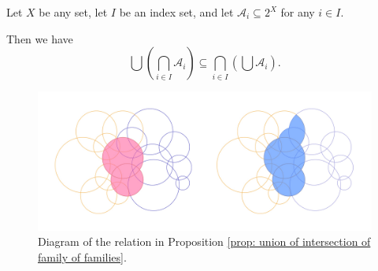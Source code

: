 \begin{proposition}
	\label{prop: union of intersection of family of families}
	Let $X$ be any set, let $I$ be an index set, and let $\mathcal A_i \subseteq 2^X$ for any $i \in I$.
	
	Then we have
	$$
	\bigcup \left( \bigcap_{i \in I} \mathcal A_i \right) \subseteq \bigcap_{i \in I} \left( \bigcup \mathcal A_i \right).
	$$
\end{proposition}


\begin{figure}[h]
	\centering
    \includegraphics[width=345pt]{notes-for-general-topology/media/intersection-of-family-of-families}
    \caption{Diagram of the relation in Proposition \ref{prop: union of intersection of family of families}.}
\end{figure}




